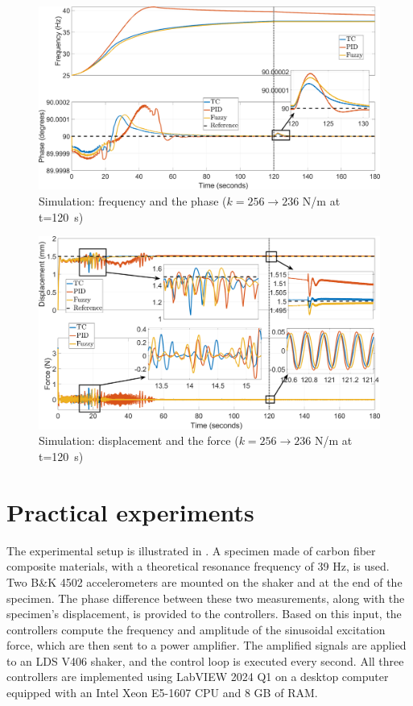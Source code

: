 \documentclass[preprint,12pt]{elsarticle}
\begin{document}
\begin{figure}
    \centering    \includegraphics[width=\linewidth]{F_frequency_sim.png}
    \caption{Simulation: frequency and the phase ($k=256 \rightarrow 236$ N/m at t=120~s)}
    \label{F_sim_frequency}
\end{figure}

\begin{figure}
    \centering    \includegraphics[width=\linewidth]{F_displacement_sim.png}
    \caption{Simulation: displacement and the force ($k=256 \rightarrow 236$ N/m at t=120~s)}
    \label{F_sim_displacement}
\end{figure}



\section{Practical experiments} \label{S_experiments}

The experimental setup is illustrated in . A specimen made of carbon fiber composite materials, with a theoretical resonance frequency of 39 Hz, is used. Two {\selectfont B\&K 4502} accelerometers are mounted on the shaker and at the end of the specimen. The phase difference between these two measurements, along with the specimen's displacement, is provided to the controllers. Based on this input, the controllers compute the frequency and amplitude of the sinusoidal excitation force, which are then sent to a power amplifier. The amplified signals are applied to an {\selectfont LDS V406} shaker, and the control loop is executed every second. All three controllers are implemented using {\selectfont LabVIEW 2024 Q1} on a desktop computer equipped with an Intel Xeon E5-1607 CPU and 8 GB of RAM.
\end{document}
